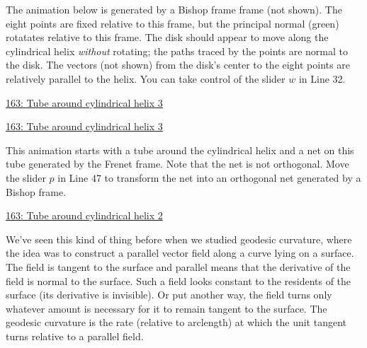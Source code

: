 \documentclass{ximera}
\begin{document}
\begin{exploration}
The animation below is generated by a Bishop frame frame (not shown). The eight points are fixed relative to this frame, but the principal normal (green) rotatates relative to this frame. The disk should appear to move along the cylindrical helix \emph{without} rotating; the paths traced by the points are normal to the disk. The vectors (not shown) from the disk's center to the eight points are relatively parallel to the helix. You can take control of the slider $w$ in Line 32.

\begin{onlineOnly}
    \begin{center}
\end{center}
\end{onlineOnly}

\href{https://www.desmos.com/3d/fg6l58x6tl}{163: Tube around cylindrical helix 3}

\href{https://www.desmos.com/3d/fg6l58x6tl}{163: Tube around cylindrical helix 3}
\end{exploration}

\begin{exploration}
This animation starts with a tube around the cylindrical helix and a net on this tube generated by the Frenet frame. Note that the net is not orthogonal. Move the slider $p$ in Line 47 to transform the net into an orthogonal net generated by a Bishop frame.

\begin{onlineOnly}
    \begin{center}
\end{center}
\end{onlineOnly}

\href{https://www.desmos.com/3d/agzievbron}{163: Tube around cylindrical helix 2}
\end{exploration}

We've seen this kind of thing before when we studied geodesic curvature, where the idea was to construct a parallel vector field along a curve lying on a surface. The field is tangent to the surface and parallel means that the derivative of the field is normal to the surface. Such a field looks constant to the residents of the surface (its derivative is invisible). Or put another way, the field turns only whatever amount is necessary for it to remain tangent to the surface. The geodesic curvature is the rate (relative to arclength) at which the unit tangent turns relative to a parallel field.
\end{document}
